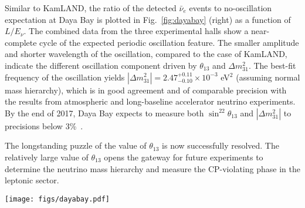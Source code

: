 Similar to KamLAND, the ratio of the detected $\bar\nu_{e}$ events to no-oscillation expectation at Daya Bay is plotted in Fig.~\ref{fig:dayabay} (right) as a function of $L/E_{\nu}$. 
The combined data from the three experimental halls show a near-complete cycle of the expected periodic oscillation feature. 
The smaller amplitude and shorter wavelength of the oscillation, compared to the case of KamLAND, indicate the different oscillation component driven by $\theta_{13}$ and $\Delta{m}^2_{31}$. 
The best-fit frequency of the oscillation yields $|\Delta{m}^2_{31}| = 2.47^{+0.11}_{-0.10} \times 10^{-3}$ eV$^2$ (assuming normal mass hierarchy), which is in good agreement and of comparable precision with the results from atmospheric and long-baseline accelerator neutrino experiments. 
By the end of 2017, Daya Bay expects to measure both $\sin^22\theta_{13}$ and $|\Delta{m}^2_{31}|$ to precisions below 3\%~\cite{Zhang-Neutrino14}.

The longstanding puzzle of the value of $\theta_{13}$ is now successfully resolved.
The relatively large value of $\theta_{13}$ opens the gateway for future experiments to determine the neutrino mass hierarchy and measure the CP-violating phase in the leptonic sector.

\begin{figure*}[htb] \label{fig:dayabay}
  \centering
  \texttt{[image: figs/dayabay.pdf]}
  \caption{{\bf Daya Bay results}~\cite{Zhang-Neutrino14}: (left) Ratio of the detected to expected $\bar\nu_{e}$ signals at the 8 antineutrino detectors (ADs) located in three experimental halls as a function of effective baseline. The oscillation survival probability at the best-fit value is given by the red curve.
  (right) Ratio of the background-subtracted $\bar\nu_e$ spectrum to the expectation for no-oscillation in the three experimental halls, re-expressed as a function of $L_{\textrm{eff}}/E_{\nu}$. The effective baseline $L_{\textrm{eff}}$ is determined for each experimental hall (EH) to an effective oscillated flux from a single baseline. The oscillation survival probability using the best estimates of $\theta_{13}$ and $|\Delta{m}^2_{31}|$ is given by the red curve.}
\end{figure*}





